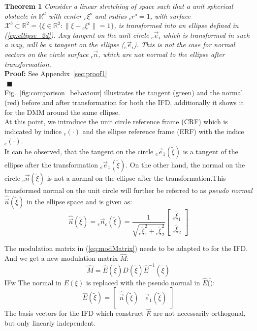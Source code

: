\noindent \textbf{Theorem 1}
\textit{Consider a linear stretching of space such that a unit spherical obstacle in $\mathbb{R}^d$ with center ${}_c \xi^o$ and radius ${}_cr^o = 1$, with surface $\mathcal{X}^b \subset \mathbb{R}^2  = \{ \xi \in \mathbb{R}^2: \| \xi - {}_c\xi^o \| = 1\}$, is transformed into an ellipse defined in (\ref{eq:ellipse_2d}). Any tangent  on the unit circle ${}_c \vec{e}_i$ which is transformed in such a way, will be a tangent on the ellipse (${}_e \vec{e}_i$). This is not the case for normal vectors on the circle surface ${}_c \vec{n}$,  which are not normal to the ellipse after transformation.}\\
\textbf{Proof:} See Appendix~\ref{sec:proof1} \\
${}$ \hfill $\blacksquare$\\

Fig.~\ref{fig:comparison_behaviour} illustrates the tangent (green) and the normal (red) before and after transformation for both the IFD, additionally it shows it for the DMM around the same ellipse. \\
At this point, we introduce the unit circle reference frame (CRF) which is indicated by indice ${}_c (\cdot)$ and the ellipse reference frame (ERF) with the indice ${}_e(\cdot)$. \\
It can be observed, that the tangent on the circle ${}_c \vec e_1(\tilde \xi)$ is a tangent of the ellipse after the transformation ${}_e \vec e_1(\tilde \xi)$. On the other hand, the normal on the circle ${}_c \vec n (\tilde \xi)$ is not a normal on the ellipse after the transformation.This transformed normal on the unit circle will further be referred to as \textit{pseudo normal} $\hat{\vec n} (\tilde \xi)$  in the ellipse space and is given as:
\begin{equation}
\hat{\vec n }(\tilde \xi) = {}_e\vec n_{c} (\tilde \xi) =   \frac{1}{\sqrt{ {}_e\tilde \xi_1^2 + {}_e \tilde \xi_2^2}}
  \begin{bmatrix}
     {}_e\tilde \xi_1 \\
     {}_e\tilde \xi_2
   \end{bmatrix}
\end{equation}

The modulation matrix in (\ref{eq:modMatrix}) needs to be adapted to for the IFD. And we get a new modulation matrix $\hat M$:
\begin{equation}
\hat M = \hat E(\tilde \xi)  D(\tilde \xi) \hat E^{-1}(\tilde \xi)\label{eq:modMatrix_IFD}
\end{equation}IFw
The normal in $E(\xi)$ is replaced with the pseudo normal in $\hat E(\tilde)$:
\begin{equation}
  \hat E(\tilde \xi) = \begin{bmatrix} \hat{\vec n}(\tilde \xi) & \vec e_1(\tilde \xi) \end{bmatrix}
\end{equation}
The basis vectors for the IFD which construct $\hat E$ are not necessarily orthogonal, but only linearly independent.

